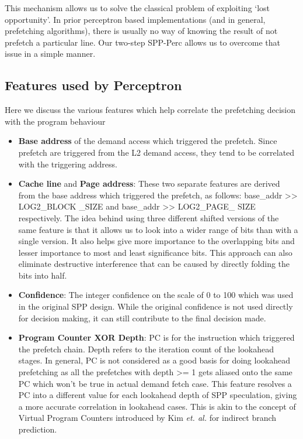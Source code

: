 \documentclass{sig-alternate}
\begin{document}
This mechanism allows us to solve the classical problem of exploiting `lost opportunity'. 
In prior perceptron based implementations (and in general, prefetching algorithms), there is usually no way of knowing the result of not prefetch a particular line.
Our two-step SPP-Perc allows us to overcome that issue in a simple manner.

\subsection{Features used by Perceptron}

Here we discuss the various features which help correlate the prefetching decision with the program behaviour
\begin{itemize}
\item \textbf{Base address} of the demand access which triggered the prefetch. 
Since prefetch are triggered from the L2 demand access, they tend to be correlated with the triggering address.

\item \textbf{Cache line} and \textbf{Page address}: These two separate features are derived from the base address which triggered the prefetch, as follows: base\_addr >> LOG2\_BLOCK \_SIZE and base\_addr >> LOG2\_PAGE\_ SIZE respectively.
The idea behind using three different shifted versions of the same feature is that it allows us to look into a wider range of bits than with a single version.
It also helps give more importance to the overlapping bits and lesser importance to most and least significance bits.
This approach can also eliminate destructive interference that can be caused by directly folding the bits into half.

\item \textbf{Confidence}: The integer confidence on the scale of 0 to 100 which was used in the original SPP design.
While the original confidence is not used directly for decision making, it can still contribute to the final decision made.

\item \textbf{Program Counter XOR Depth}: PC is for the instruction which triggered the prefetch chain.
Depth refers to the iteration count of the lookahead stages.
In general, PC is not considered as a good basis for doing lookahead prefetching as all the prefetches with depth >= 1 gets aliased onto the same PC which won't be true in actual demand fetch case.
This feature resolves a PC into a different value for each lookahead depth of SPP speculation, giving a more accurate correlation in lookahead cases.
This is akin to the concept of Virtual Program Counters\cite{VPC} introduced by Kim \textit{et. al.} for indirect branch prediction.



\end{itemize}
\end{document}

